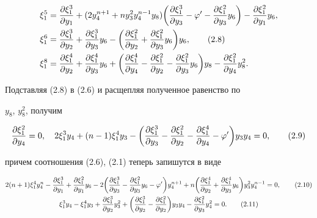\begin{align}


\xi^5_1&=\frac{\dk^3_1}{\dy_1}+(2y^{n+1}_4+ny^2_3y^{n-1}_4y_8)


\biggl(\frac{\dk^3_1}{\dy_3}-\varphi'-\frac{\dk^2_1}{\dy_3}y_6\biggr)


-\frac{\dk^2_1}{\dy_1}y_6,\notag\\


\xi^6_1&=\frac{\dk^3_1}{\dy_2}+\frac{\dk^3_1}{\dy_3}y_6-


\biggl(\frac{\dk^2_1}{\dy_2}+\frac{\dk^2_1}{\dy_3}y_6\biggr)y_6,\tag{2.8}\\


\xi^8_1&=\frac{\dk^4_1}{\dy_2}+\frac{\dk^4_1}{\dy_3}y_6+\biggl(


\frac{\dk^4_1}{\dy_4}-\frac{\dk^2_1}{\dy_2}-


\frac{\dk^2_1}{\dy_3}y_6\biggr)y_8-\frac{\dk^2_1}{\dy_4}y^2_8.\notag


\end{align}


Подставляя (2.8) в (2.6) и расщепляя полученное равенство по


$y_8$, $y^2_8$, получим


\begin{equation}


\frac{\dk^2_1}{\dy_4}=0,\quad 2\xi^3_1y_4+(n-1)\xi^4_1y_3-\biggl(


\frac{\dk^3_1}{\dy_3}-\frac{\dk^2_1}{\dy_2}-\frac{\dk^4_1}{\dy_4}


-\varphi'\biggr)y_3y_4=0,\tag{2.9}


\end{equation}


причем соотношения (2.6), (2.1) теперь запишутся в виде


\begin{gather}


2(n+1)\xi^4_1y^n_4-\frac{\dk^3_1}{\dy_1}+


\frac{\dk^2_1}{\dy_1}y_6-2\biggl(


\frac{\dk^3_1}{\dy_3}-\frac{\dk^2_1}{\dy_3}y_6-\varphi'\biggr)


y^{n+1}_4+n\biggl(\frac{\dk^4_1}{\dy_2}+


\frac{\dk^4_1}{\dy_3}y_6\biggr)y^2_3y^{n-1}_4=0,\tag{2.10}\\


\xi^3_1y_4-\xi^4_1y_3+\frac{\dk^3_1}{\dy_2}y^2_3+\biggl(


\frac{\dk^3_1}{\dy_2}-\frac{\dk^2_1}{\dy_2}\biggr)y_3y_4-


\frac{\dk^2_1}{\dy_3}y^2_4=0.\tag{2.11}


\end{gather}


